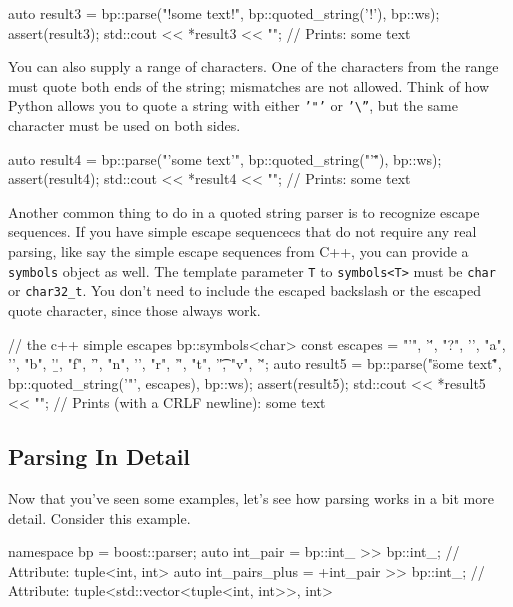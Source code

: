 \begin{code}
auto result3 = bp::parse("!some text!", bp::quoted_string('!'), bp::ws);
assert(result3);
std::cout << *result3 << "\n"; // Prints: some text
\end{code}

You can also supply a range of characters. One of the characters from the range must quote both ends of the string; mismatches are not allowed. Think of how Python allows you to quote a string with either \texttt{'"'} or \texttt{'\textbackslash{}''}, but the same character must be used on both sides.

\begin{code}
auto result4 = bp::parse("'some text'", bp::quoted_string("'\""), bp::ws);
assert(result4);
std::cout << *result4 << "\n"; // Prints: some text
\end{code}

Another common thing to do in a quoted string parser is to recognize escape sequences. If you have simple escape sequencecs that do not require any real parsing, like say the simple escape sequences from C++, you can provide a \texttt{symbols} object as well. The template parameter \texttt{T} to \texttt{symbols<T>} must be \texttt{char} or \texttt{char32\_t}. You don't need to include the escaped backslash or the escaped quote character, since those always work.

\begin{code}
// the c++ simple escapes
bp::symbols<char> const escapes = {
    {"'", '\''},
    {"?", '\?'},
    {"a", '\a'},
    {"b", '\b'},
    {"f", '\f'},
    {"n", '\n'},
    {"r", '\r'},
    {"t", '\t'},
    {"v", '\v'}};
auto result5 =
    bp::parse("\"some text\r\"", bp::quoted_string('"', escapes), bp::ws);
assert(result5);
std::cout << *result5 << "\n"; // Prints (with a CRLF newline): some text
\end{code}

\label{tutorial_split_002.html}{}

\subsection{Parsing In Detail}

Now that you've seen some examples, let's see how parsing works in a bit more detail. Consider this example.

\begin{code}
namespace bp = boost::parser;
auto int_pair = bp::int_ >> bp::int_;         // Attribute: tuple<int, int>
auto int_pairs_plus = +int_pair >> bp::int_;  // Attribute: tuple<std::vector<tuple<int, int>>, int>
\end{code}

